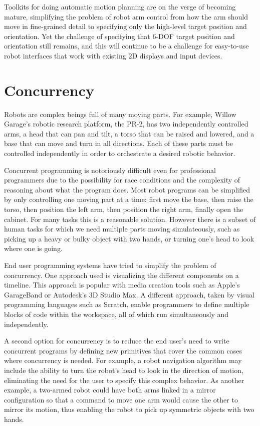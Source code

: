 \documentclass{article}
\begin{document}
Toolkits for doing automatic motion planning are on the verge of becoming mature, simplifying the problem of robot arm control from how the arm should move in fine-grained detail to specifying only the high-level target position and orientation. Yet the challenge of specifying that 6-DOF target position and orientation still remains, and this will continue to be a challenge for easy-to-use robot interfaces that work with existing 2D displays and input devices.

\section{Concurrency}


Robots are complex beings full of many moving parts. For example, Willow Garage's robotic research platform, the PR-2, has two independently controlled arms, a head that can pan and tilt, a torso that can be raised and lowered, and a base that can move and turn in all directions. Each of these parts must be controlled independently in order to orchestrate a desired robotic behavior.

Concurrent programming is notoriously difficult even for professional programmers due to the possibility for race conditions and the complexity of reasoning about what the program does. Most robot programs can be simplified by only controlling one moving part at a time: first move the base, then raise the torso, then position the left arm, then position the right arm, finally open the cabinet. For many tasks this is a reasonable solution. However there is a subset of human tasks for which we need multiple parts moving simulateously, such as picking up a heavy or bulky object with two hands, or turning one's head to look where one is going.

End user programming systems have tried to simplify the problem of concurrency. One approach used is visualizing the different components on a timeline. This approach is popular with media creation tools such as Apple's GarageBand or Autodesk's 3D Studio Max. A different approach, taken by visual programming languages such as Scratch, enable programmers to define multiple blocks of code within the workspace, all of which run simultaneously and independently.

A second option for concurrency is to reduce the end user's need to write concurrent programs by defining new primitives that cover the common cases where concurrency is needed.  For example, a robot navigation algorithm may include the ability to turn the robot's head to look in the direction of motion, eliminating the need for the user to specify this complex behavior.  As another example, a two-armed robot could have both arms linked in a mirror configuration so that a command to move one arm would cause the other to mirror its motion, thus enabling the robot to pick up symmetric objects with two hands.
\end{document}

